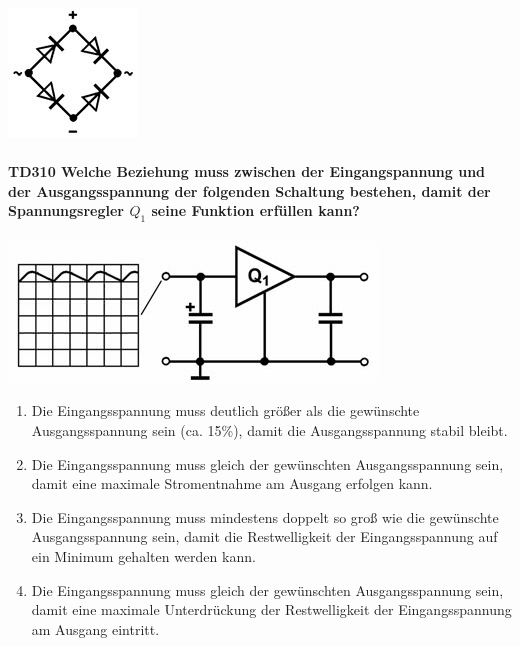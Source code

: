 \documentclass[8pt]{article}
\begin{document}
\begin{enumerate}
\begin{enumerate}[nolistsep,label=\Alph*]
\begin{enumerate}[nolistsep,label=\Alph*]
\begin{center}
	\begin{minipage}{\linewidth}
		\centering
		\includegraphics[scale=1.0]{pics/td309_d.jpg}
	\end{minipage}
\end{center}
\end{enumerate}

\paragraph*{TD310 Welche Beziehung muss zwischen der Eingangspannung und der Ausgangsspannung der folgenden Schaltung bestehen, damit der Spannungsregler $Q_{1}$ seine Funktion erfüllen kann?}
\begin{center}
	\begin{minipage}{\linewidth}
		\centering
		\includegraphics[scale=1.0]{pics/td310_a.jpg}
	\end{minipage}
\end{center}
\begin{enumerate}[nolistsep,label=\Alph*]
\item Die Eingangsspannung muss deutlich größer als die gewünschte Ausgangsspannung sein (ca. 15\%), damit die Ausgangsspannung stabil bleibt.
\item Die Eingangsspannung muss gleich der gewünschten Ausgangsspannung sein, damit eine maximale Stromentnahme am Ausgang erfolgen kann.
\item Die Eingangsspannung muss mindestens doppelt so groß wie die gewünschte Ausgangsspannung sein, damit die Restwelligkeit der Eingangsspannung auf ein Minimum gehalten werden kann.
\item Die Eingangsspannung muss gleich der gewünschten Ausgangsspannung sein, damit eine maximale Unterdrückung der Restwelligkeit der Eingangsspannung am Ausgang eintritt. 
\end{enumerate}


\end{enumerate}
\end{enumerate}
\end{document}
